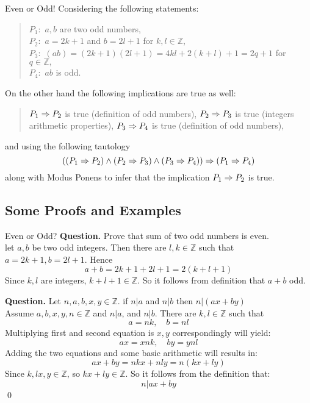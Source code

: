 \begin{example}{Even or Odd!}
	 Considering the following statements:
	\begin{quote}
		$ P_1:$ $ a,b $ are two odd numbers, \\
		$ P_2:$ $ a = 2k+1 $ and $ b=2l+1 $ for $ k,l \in \mathbb{Z} $, \\
		$ P_3:$ $ (ab) = (2k+1)(2l+1) = 4kl+2(k+l)+1 = 2q+1 $ for $ q \in \mathbb{Z}, $ \\
		$ P_4:$ $ ab $ is odd.
	\end{quote}
	On the other hand the following implications are true as well:
	\begin{quote}
		$ P_1 \Rightarrow P_2 $ is true (definition of odd numbers),
		$ P_2 \Rightarrow P_3 $ is true (integers arithmetic properties),
		$ P_3 \Rightarrow P_4 $ is true (definition of odd numbers),
	\end{quote}
	and using the following tautology
	\[  ((P_1 \Rightarrow P_2) \wedge (P_2 \Rightarrow P_3) \wedge (P_3 \Rightarrow P_4)) \Rightarrow (P_1 \Rightarrow P_4)  \]
	along with Modus Ponens to infer that the implication $ P_1 \Rightarrow P_2 $ is true.
\end{example}

\subsection{Some Proofs and Examples}


\begin{example}{Even or Odd?}
	\textbf{Question.} Prove that sum of two odd numbers is even. \\
	
	 let $ a,b $ be two odd integers. Then there are $ l,k \in \mathbb{Z} $ such that $ a = 2k+1, b = 2l+1 $. Hence \[ a+b = 2k+1+2l+1 = 2(k+l+1) \]
	Since $ k,l $ are integers, $ k+l+1 \in \mathbb{Z} $. So it follows from definition that $ a+b $ odd.
\end{example}

\begin{example}{}
	\textbf{Question.} Let $ n,a,b,x,y \in \mathbb{Z} $. if $ n|a $ and $ n|b $ then $ n|(ax+by) $ \\
	
	Assume $ a,b,x,y,n \in \mathbb{Z} $ and $ n|a $, and $ n|b $. There are $ k,l \in \mathbb{Z} $ such that 
	\[ a = nk, \quad b = nl \]
	Multiplying first and second equation is $ x,y $ correspondingly will yield:
	\[ ax = xnk, \quad by = ynl \]
	Adding the two equations and some basic arithmetic will results in: 
	\[ax + by = nkx + nly = n(kx+ly)\]
	Since $ k,lx,y \in \mathbb{Z} $, so $ kx+ly \in \mathbb{Z} $. So it follows from the definition that:
	\[ n|ax + by \] 	\qed
\end{example}

